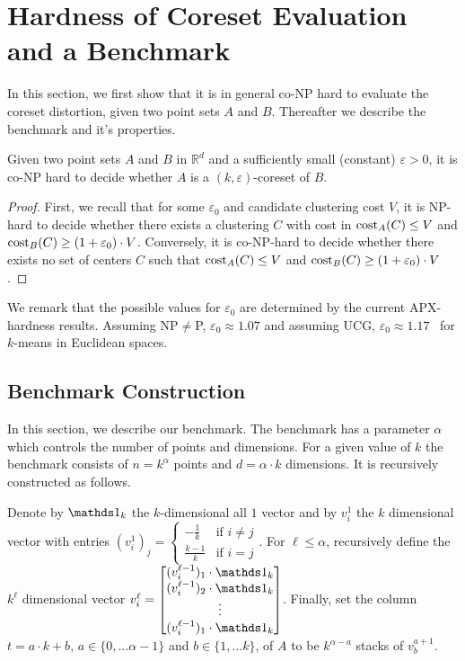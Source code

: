 \section{Hardness of Coreset Evaluation and a Benchmark}
\label{sec:coreset-evaluation-hard}
\label{sec:benchmark}

In this section, we first show that it is in general co-NP hard to evaluate the coreset distortion, given two point sets $A$ and $B$. Thereafter we describe the benchmark and it's properties.


\begin{proposition}
Given two point sets $A$ and $B$ in $\mathbb{R}^d$ and a sufficiently small (constant) $\varepsilon>0$, it is co-NP hard to decide whether $A$ is a $(k,\varepsilon)$-coreset of $B$.
\end{proposition}
\begin{proof}
First, we recall that for some $\varepsilon_0$ and candidate clustering cost $V$, it is NP-hard to decide whether there exists a clustering $C$ with cost in $\text{cost}_A(C)\leq V$ and $\text{cost}_B(C)\geq (1+\varepsilon_0)\cdot V$.
Conversely, it is co-NP-hard to decide whether there exists no set of centers $C$ such that $\text{cost}_A(C)\leq V$ and $\text{cost}_B(C) \geq (1+\varepsilon_0)\cdot V$.
\end{proof}

We remark that the possible values for $\varepsilon_0$ are determined by the current APX-hardness results. Assuming NP$\neq$P, $\varepsilon_0\approx 1.07$ and assuming UCG, $\varepsilon_0 \approx 1.17$~\cite{Cohen-AddadSL21,Cohen-AddadS19} for $k$-means in Euclidean spaces.

\subsection{Benchmark Construction}

In this section, we describe our benchmark. The benchmark has a parameter $\alpha$ which controls the number of points and dimensions.
For a given value of $k$ the benchmark consists of $n=k^\alpha$ points and $d=\alpha \cdot k$ dimensions.
It is recursively constructed as follows.

Denote by $\one_k$ 
the $k$-dimensional all $1$ vector and by $v_i^1$ the $k$ dimensional vector with entries $(v_i^1)_j = \begin{cases}-\frac{1}{k} & \text{if } i\neq j\\
\frac{k-1}{k} & \text{if } i= j\end{cases}$.
For $\ell\leq \alpha$, recursively define the $k^{\ell}$ dimensional vector $v_i^{\ell} = \begin{bmatrix}
(v_i^{\ell-1})_1 \cdot \one_k \\
(v_i^{\ell-1})_2 \cdot \one_k \\
\vdots \\
(v_i^{\ell-1})_1 \cdot \one_k
\end{bmatrix}$. Finally, set the column $t = a\cdot k + b$, $a\in \{0,\ldots \alpha-1\}$ and $b \in \{1,\ldots k\}$, of $A$ to be $k^{\alpha-a}$  stacks of $v_b^{a+1}$.



